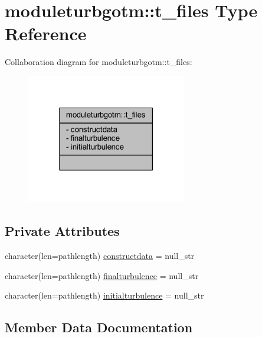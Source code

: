 \hypertarget{structmoduleturbgotm_1_1t__files}{}\section{moduleturbgotm\+:\+:t\+\_\+files Type Reference}
\label{structmoduleturbgotm_1_1t__files}


Collaboration diagram for moduleturbgotm\+:\+:t\+\_\+files\+:\nopagebreak
\begin{figure}[H]
\begin{center}
\leavevmode
\includegraphics[width=198pt]{structmoduleturbgotm_1_1t__files__coll__graph}
\end{center}
\end{figure}
\subsection*{Private Attributes}
\begin{DoxyCompactItemize}
\item 
character(len=pathlength) \mbox{\hyperlink{structmoduleturbgotm_1_1t__files_a495c97ced637f45b38596ddcbaa16e1f}{constructdata}} = null\+\_\+str
\item 
character(len=pathlength) \mbox{\hyperlink{structmoduleturbgotm_1_1t__files_a79bd86466f119993387428e407059bdc}{finalturbulence}} = null\+\_\+str
\item 
character(len=pathlength) \mbox{\hyperlink{structmoduleturbgotm_1_1t__files_a1d6471cf8e421513b6162b58da7f5e47}{initialturbulence}} = null\+\_\+str
\end{DoxyCompactItemize}


\subsection{Member Data Documentation}
\mbox{\label{structmoduleturbgotm_1_1t__files_a495c97ced637f45b38596ddcbaa16e1f}} 
